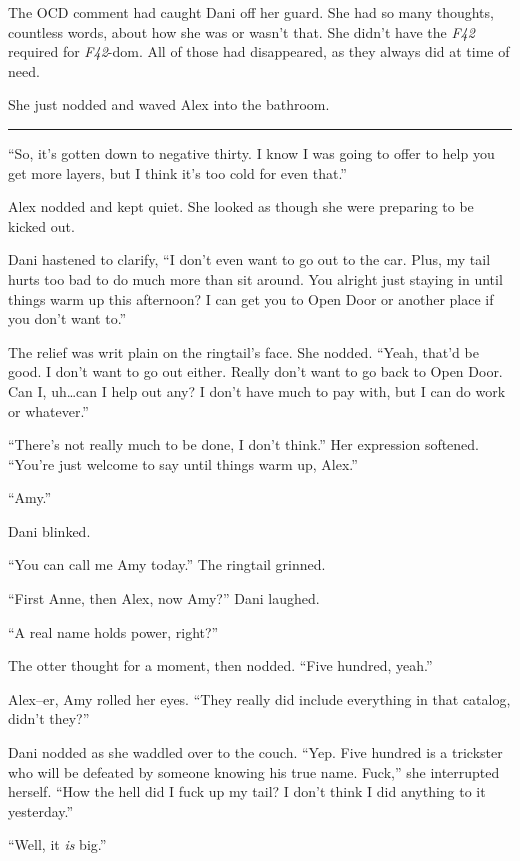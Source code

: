 The OCD comment had caught Dani off her guard. She had so many thoughts, countless words, about how she was or wasn't that. She didn't have the \emph{F42} required for \emph{F42}-dom. All of those had disappeared, as they always did at time of need.

She just nodded and waved Alex into the bathroom.

\begin{center}\rule{0.5\linewidth}{\linethickness}\end{center}

``So, it's gotten down to negative thirty. I know I was going to offer to help you get more layers, but I think it's too cold for even that.''

Alex nodded and kept quiet. She looked as though she were preparing to be kicked out.

Dani hastened to clarify, ``I don't even want to go out to the car. Plus, my tail hurts too bad to do much more than sit around. You alright just staying in until things warm up this afternoon? I can get you to Open Door or another place if you don't want to.''

The relief was writ plain on the ringtail's face. She nodded. ``Yeah, that'd be good. I don't want to go out either. Really don't want to go back to Open Door. Can I, uh\ldots{}can I help out any? I don't have much to pay with, but I can do work or whatever.''

``There's not really much to be done, I don't think.'' Her expression softened. ``You're just welcome to say until things warm up, Alex.''

``Amy.''

Dani blinked.

``You can call me Amy today.'' The ringtail grinned.

``First Anne, then Alex, now Amy?'' Dani laughed.

``A real name holds power, right?''

The otter thought for a moment, then nodded. ``Five hundred, yeah.''

Alex--er, Amy rolled her eyes. ``They really did include everything in that catalog, didn't they?''

Dani nodded as she waddled over to the couch. ``Yep. Five hundred is a trickster who will be defeated by someone knowing his true name. Fuck,'' she interrupted herself. ``How the hell did I fuck up my tail? I don't think I did anything to it yesterday.''

``Well, it \emph{is} big.''

